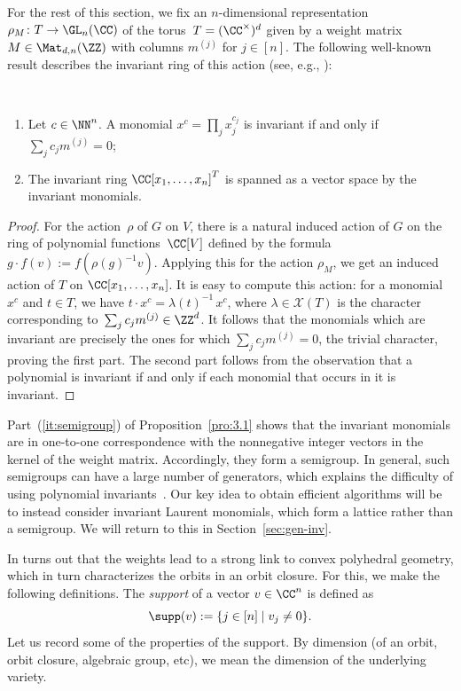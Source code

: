 For the rest of this section, we fix an $n$-dimensional representation $\rho_M \colon T \rightarrow \GL_n(\CC)$ of the torus~$T=(\CC^\times)^d$
given by a weight matrix $M \in \Mat_{d,n}(\ZZ)$ with columns $m^{(j)}$ for $j\in[n]$.
The following well-known result describes the invariant ring of this action (see, e.g., \cite[Section~3]{DM-exp}):

\begin{proposition}\label{pro:3.1}~
\begin{enumerate}
\item\label{it:semigroup} Let $c\in\NN^n$. A monomial $x^c=\prod_j x_j^{c_j}$ is invariant if and only if $\sum_j c_j m^{(j)} = 0$;
\item The invariant ring $\CC[x_1,\dots,x_n]^T$ is spanned as a vector space by the invariant monomials.
\end{enumerate}
\end{proposition}
\begin{proof}
For the action~$\rho$ of $G$ on $V$, there is a natural induced action of $G$ on the ring of polynomial functions~$\CC[V]$ defined by the formula $g \cdot f (v) := f(\rho(g)^{-1}v)$.
Applying this for the action $\rho_M$, we get an induced action of $T$ on $\CC[x_1,\dots,x_n]$.
It is easy to compute this action:
for a monomial~$x^c$ and $t \in T$, we have $t \cdot x^c = \lambda(t)^{-1} \, x^c$, where $\lambda \in \mathcal{X}(T)$ is the character corresponding to~$\sum_j c_j m^{(j)} \in \ZZ^d$.
It follows that the monomials which are invariant are precisely the ones for which $\sum_j c_j m^{(j)} = 0$, the trivial character, proving the first part.
The second part follows from the observation that a polynomial is invariant if and only if each monomial that occurs in it is invariant.
\end{proof}

Part~(\ref{it:semigroup}) of Proposition~\ref{pro:3.1} shows that the invariant monomials are in one-to-one correspondence with the nonnegative integer vectors in the kernel of the weight matrix.
Accordingly, they form a semigroup.
In general, such semigroups can have a large number of generators, which explains the difficulty of using polynomial invariants~\cite{durand-et-al:02}.
Our key idea to obtain efficient algorithms will be to instead consider invariant Laurent monomials, which form a lattice rather than a semigroup.
We will return to this in Section~\ref{sec:gen-inv}.

In turns out that the weights lead to a strong link to convex polyhedral geometry, which in turn characterizes the orbits in an orbit closure.
For this, we make the following definitions.
The \textit{support} of a vector $v\in \CC^n$ is defined as
\[
  \supp(v) := \{j\in [n]\mid v_j\neq 0\}.
\]
Let us record some of the properties of the support. By dimension (of an orbit, orbit closure, algebraic group, etc), we mean the dimension of the underlying variety.

